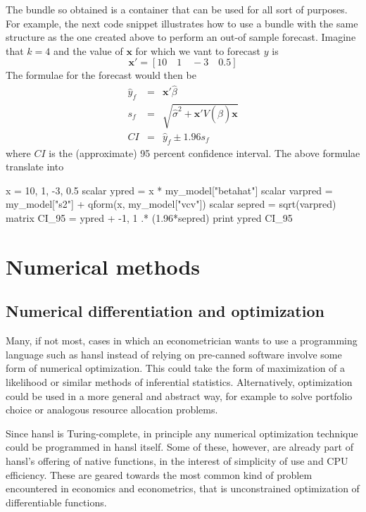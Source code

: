 The bundle so obtained is a container that can be used for all sort of
purposes. For example, the next code snippet illustrates how to use
a bundle with the same structure as the one created above to perform
an out-of sample forecast. Imagine that $k=4$ and the value of
$\mathbf{x}$ for which we vant to forecast $y$ is
\[
  \mathbf{x}' = [ 10 \quad 1  \quad -3 \quad 0.5 ]
\]
The formulae for the forecast would then be
\begin{eqnarray*}
  \hat{y}_f & = & \mathbf{x}'\hat{\beta} \\
  s_f & = & \sqrt{\hat{\sigma}^2 + \mathbf{x}'V(\hat{\beta})\mathbf{x}} \\
  CI & = & \hat{y}_f \pm 1.96 s_f 
\end{eqnarray*}
where $CI$ is the (approximate) 95 percent confidence interval. The
above formulae translate into
\begin{code}
  x = { 10, 1, -3, 0.5 }
  scalar ypred    = x * my_model["betahat"]
  scalar varpred  = my_model["s2"] + qform(x, my_model["vcv"])
  scalar sepred   = sqrt(varpred)
  matrix CI_95    = ypred + {-1, 1} .* (1.96*sepred)
  print ypred CI_95
\end{code}




\chapter{Numerical methods}

\section{Numerical differentiation and optimization}

Many, if not most, cases in which an econometrician wants to use a
programming language such as hansl instead of relying on pre-canned
software involve some form of numerical optimization. This could take
the form of maximization of a likelihood or similar methods of
inferential statistics. Alternatively, optimization could be used in a
more general and abstract way, for example to solve portfolio choice
or analogous resource allocation problems.

Since hansl is Turing-complete, in principle any numerical
optimization technique could be programmed in hansl itself. Some of
these, however, are already part of hansl's offering of native
functions, in the interest of simplicity of use and CPU
efficiency. These are geared towards the most common kind of problem
encountered in economics and econometrics, that is unconstrained
optimization of differentiable functions.

